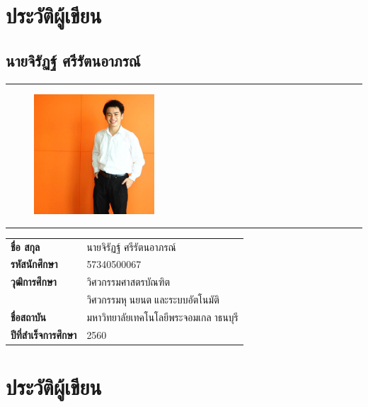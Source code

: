 \clearpage

\chapter*{ประวัติผู้เขียน}
\section*{นายจิรัฏฐ์ ศรีรัตนอาภรณ์}

\hrule height .7pt
\begin{figure}[!ht]
	\centering
	\includegraphics[width=0.4\textwidth]{pages/images/jirad.jpg}
\end{figure}
\hrule height .7pt
\raggedright
\begin{tabular}{p{} p{}}
    \textbf{ชื่อ สกุล} & {นายจิรัฏฐ์ ศรีรัตนอาภรณ์} \\
    \textbf{รหัสนักศึกษา} & {57340500067}\\
    \textbf{วุฒิการศึกษา} & {วิศวกรรมศาสตรบัณฑิต} \\
    {} & {วิศวกรรมหุนยนตและระบบอัตโนมัติ}\\
    \textbf{ชื่อสถาบัน} & {มหาวิทยาลัยเทคโนโลยีพระจอมเกลาธนบุรี} \\
    \textbf{ปีที่สำเร็จการศึกษา} & {2560} \\
\end{tabular}   

\chapter*{ประวัติผู้เขียน}

